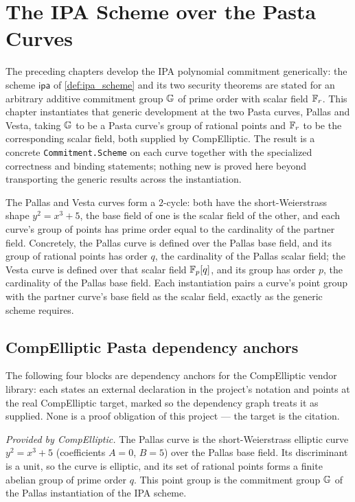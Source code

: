 \chapter{The IPA Scheme over the Pasta Curves}

The preceding chapters develop the IPA polynomial commitment generically: the
scheme \(\textsf{ipa}\) of \cref{def:ipa_scheme} and its two security theorems are
stated for an arbitrary additive commitment group \(\mathbb{G}\) of prime order with
scalar field \(\mathbb{F}_r\). This chapter instantiates that generic development at the two
Pasta curves, Pallas and Vesta, taking \(\mathbb{G}\) to be a Pasta curve's group of
rational points and \(\mathbb{F}_r\) to be the corresponding scalar field, both supplied by
CompElliptic. The result is a concrete \texttt{Commitment.Scheme} on each curve
together with the specialized correctness and binding statements; nothing new is
proved here beyond transporting the generic results across the instantiation.

The Pallas and Vesta curves form a \(2\)-cycle: both have the short-Weierstrass
shape \(y^{2} = x^{3} + 5\), the base field of one is the scalar field of the
other, and each curve's group of points has prime order equal to the cardinality of
the partner field. Concretely, the Pallas curve is defined over the Pallas base
field, and its group of rational points has order \(q\), the cardinality of the
Pallas scalar field; the Vesta curve is defined over that scalar field \(\mathbb{F}_p[q]\),
and its group has order \(p\), the cardinality of the Pallas base field. Each
instantiation pairs a curve's point group with the partner curve's base field as
the scalar field, exactly as the generic scheme requires.

\section{CompElliptic Pasta dependency anchors}

The following four blocks are dependency anchors for the CompElliptic vendor
library: each states an external declaration in the project's notation and points
\lean{} at the real CompElliptic target, marked \mathlibok so the dependency graph
treats it as supplied. None is a proof obligation of this project — the \lean{}
target is the citation.

\begin{definition}
  \label{def:pallas_group}
  \mathlibok
  \textit{Provided by CompElliptic.}
  The Pallas curve is the short-Weierstrass elliptic curve
  \(y^{2} = x^{3} + 5\) (coefficients \(A = 0\), \(B = 5\)) over the Pallas base
  field. Its discriminant is a unit, so the curve is elliptic, and its set of
  rational points forms a finite abelian group of prime order \(q\). This point
  group is the commitment group \(\mathbb{G}\) of the Pallas instantiation of the IPA
  scheme.
\end{definition}


